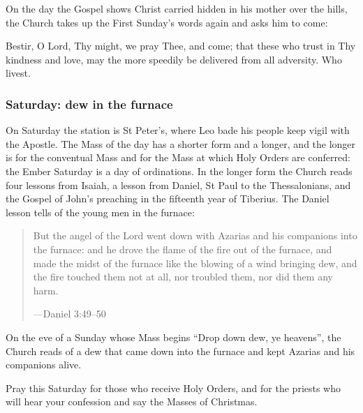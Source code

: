 On the day the Gospel shows Christ carried hidden in his mother over the hills,
the Church takes up the First Sunday's words again and asks him to come:

\begin{studyframe}
\medskip

Bestir, O Lord, Thy might, we pray Thee, and come; that these who trust in Thy
kindness and love, may the more speedily be delivered from all adversity. Who
livest.\par
\end{studyframe}

\subsubsection*{Saturday: dew in the furnace}

On Saturday the station is St Peter's, where Leo bade his people keep vigil
with the Apostle. The Mass of the day has a shorter form and a longer, and the
longer is for the conventual Mass and for the Mass at which Holy Orders are
conferred: the Ember Saturday is a day of ordinations. In
the longer form the Church reads four lessons from Isaiah, a lesson from Daniel,
St Paul to the Thessalonians, and the Gospel of John's preaching in the
fifteenth year of Tiberius. The Daniel lesson tells of the young men in the
furnace:

\begin{quote}
But the angel of the Lord went down with Azarias and his companions into the
furnace: and he drove the flame of the fire out of the furnace, and made the
midst of the furnace like the blowing of a wind bringing dew, and the fire
touched them not at all, nor troubled them, nor did them any harm.\par
{\smallskip\noindent\small ---Daniel 3:49--50\par}
\end{quote}

On the eve of a Sunday whose Mass begins ``Drop down dew, ye heavens'', the
Church reads of a dew that came down into the furnace and kept Azarias and his
companions alive.

Pray this Saturday for those who receive Holy Orders, and for the priests who
will hear your confession and say the Masses of Christmas.
